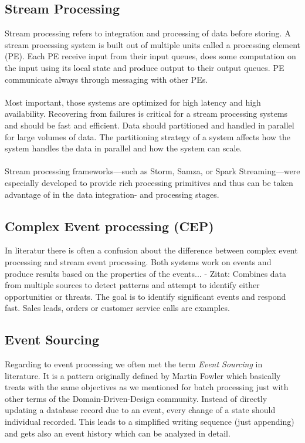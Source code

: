 \subsection{Stream Processing}
\label{intro-datastream-streamprocessing}
Stream processing refers to integration and processing of data before storing. 
A stream processing system is built out of multiple units called a processing
element (PE). Each PE receive input from their input queues, does some
computation on the input using its local state and produce output to their
output queues. PE communicate always through messaging with other PEs. 
\\ \\
Most important, those systems are optimized for high latency and high
availability. Recovering from failures is critical for a stream processing
systems and should be fast and efficient. 
Data should partitioned and handled in parallel for large volumes of data. 
The partitioning strategy of a system  affects how the system
handles the data in parallel and how the system can scale. 
\cite{PrpSvyOfDSPS}
\\ \\
Stream processing frameworks---such as Storm, Samza, or Spark
Streaming---were especially developed to provide rich processing primitives and thus can be taken advantage of
in the data integration- and processing stages.

\subsection{Complex Event processing (CEP)}
In literatur there is often a confusion about the difference between
complex event processing and stream event processing. Both systems work on
events and produce results based on the properties of the events... 
- Zitat: Combines data from multiple sources  to detect patterns and attempt to
identify either opportunities or threats. The goal is to identify significant
events and respond fast. Sales leads, orders or customer service calls are
examples.\\


\subsection{Event Sourcing}
\label{event-sourcing}
Regarding to event processing we often met the term \textit{Event Sourcing} in
literature. It is a pattern originally defined by Martin Fowler which basically
treats with the same objectives as we mentioned for batch processing just with
other terms of the Domain-Driven-Design community. Instead of directly updating
a database record due to an event, every change of a state should individual
recorded. This leads to a simplified writing sequence (just appending) and gets
also an event history which can be analyzed in detail. 

